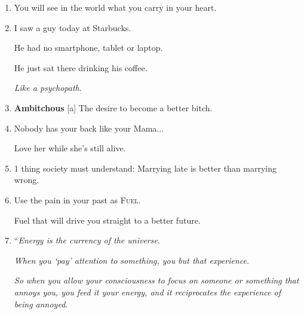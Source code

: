 \documentclass{article}
\numberwithin{equation}{section}
\begin{document}
\begin{enumerate}
    ``\textit{Don't worry about what people think of you or about the way they try to make you feel}.
    
    \textit{If people want to see you as a good person, they will}.
    
    \textit{If they want to see you as a bad person, absolutely nothing you do will stop them}.
    
    \textit{Ironically, the more you try to show them your good intentions, the more reason you give them to knock you down if they are committed to misunderstanding you}.
    
    \textit{Keep your head up high and be confident in what you do}.
    
    \textit{Be confident in your intentions and keep your eyes ahead instead of wasting your time on those who want to drag you back}.
    
    \textit{Because you can't change people's views, you have to believe that true change for yourself comes from within you, not from anyone else}.'' - Najwa Zebian
    \item You will see in the world what you carry in your heart.
    \item I saw a guy today at Starbucks.
    
    He had no smartphone, tablet or laptop.
    
    He just sat there drinking his coffee.
    
    \textit{Like a psychopath}.
    \item \textbf{Ambitchous} [a] The desire to become a better bitch.
    \item Nobody has your back like your Mama$\ldots$
    
    Love her while she's still alive.
    \item 1 thing society must understand: Marrying late is better than marrying wrong.
    \item Use the pain in your past as \textsc{Fuel}.
    
    Fuel that will drive you straight to a better future.
    \item ``\textit{Energy is the currency of the universe}.
    
    \textit{When you `pay' attention to something, you but that experience}.
    
    \textit{So when you allow your consciousness to focus on someone or something that annoys you, you feed it your energy, and it reciprocates the experience of being annoyed}.
    

\end{enumerate}
\end{document}
